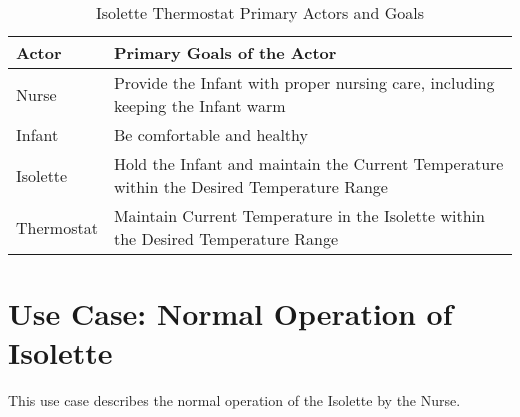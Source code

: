 \begin{table}
\begin{tabular}{|l|l|}
\hline
{\bf Actor} & {\bf Primary Goals of the Actor} \\\hline
Nurse & \begin{minipage}[t]{11cm}
        Provide the Infant with proper nursing care, including keeping the Infant warm
        \end{minipage}
\\\hline
Infant & \begin{minipage}[t]{11cm}
         Be comfortable and healthy
         \end{minipage}
\\\hline
Isolette & \begin{minipage}[t]{11cm}
           Hold the Infant and maintain the Current Temperature within the Desired Temperature Range
           \end{minipage}
\\\hline
Thermostat & \begin{minipage}[t]{11cm}
             Maintain Current Temperature in the Isolette within the Desired Temperature Range
             \end{minipage}
\\\hline
\end{tabular}
\caption{Isolette Thermostat Primary Actors and Goals}
\label{tab:actors-goals}
\end{table}

\section{Use Case:  Normal Operation of Isolette}
\label{sec:uc-normal-operational}

This use case describes the normal operation of the Isolette by the Nurse.

